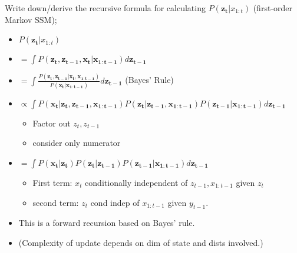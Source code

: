 \documentclass{article}
\begin{document}
Write down/derive the recursive formula for calculating $P(\mathbf{z_t}|x_{1:t})$ (first-order Markov SSM); \begin{itemize} \item $P(\mathbf{z_t}|x_{1:t})$ \item $=\int P(\mathbf{z_t, z_{t-1}, x_t |x_{1:t-1}})d\mathbf{z_{t-1}}$ \item $=\int \frac{P(\mathbf{z_t, z_{t-1}|x_t, x_{1:t-1}})}{P(\mathbf{x_t|x_{1:t-1}})}d\mathbf{z_{t-1}}$ (Bayes' Rule) \item $\propto\int P(\mathbf{x_t| z_t, z_{t-1}, x_{1:t-1}})P(\mathbf{z_t|z_{t-1}, x_{1:t-1}}) P(\mathbf{z_{t-1}|x_{1:t-1}}) d\mathbf{z_{t-1}}$ \begin{itemize} \item Factor out $z_t, z_{t-1}$ \item consider only numerator \end{itemize} \item $=\int P(\mathbf{x_t| z_t})P(\mathbf{z_t|z_{t-1}}) P(\mathbf{z_{t-1}|x_{1:t-1}}) d\mathbf{z_{t-1}}$ \begin{itemize} \item First term: $x_t$ conditionally independent of $z_{t-1}, x_{1:t-1}$ given $z_t$ \item second term: $z_t$ cond indep of $x_{1:t-1}$ given $y_{t-1}$. \end{itemize} \item This is a forward recursion based on Bayes' rule.  \item (Complexity of update depends on dim of state and dists involved.) \end{itemize}
\end{document}
